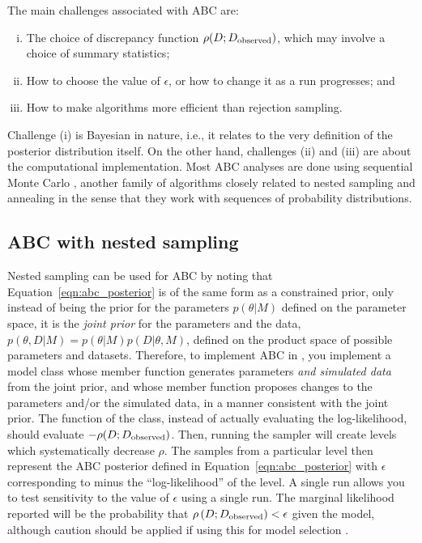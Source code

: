\documentclass[article]{jss}
\begin{document}
The main challenges associated with ABC are:
\begin{enumerate}[(i)]
\item The choice of discrepancy function $\rho(D; D_{\rm observed})$, which
may involve a choice of summary statistics;
\item How to choose the value of $\epsilon$, or how to change it as a run
progresses; and
\item How to make algorithms more efficient than rejection sampling.
\end{enumerate}
Challenge (i) is Bayesian in nature, i.e., it relates to the very
definition of the posterior distribution itself.
On the other hand, challenges (ii) and (iii) are about the computational
implementation. Most ABC analyses are done using sequential Monte Carlo
\citep[SMC; ][]{del2012adaptive}, another family of algorithms closely related
to nested sampling and annealing in the sense that they work with
sequences of probability distributions.

\subsection{ABC with nested sampling}
Nested sampling can be used for ABC by noting that Equation~\ref{eqn:abc_posterior}
is of the same form as a constrained prior, only instead of being the prior
for the parameters $p(\theta | M)$ defined on the parameter space, it is
the {\em joint prior} for the parameters and the data,
$p(\theta, D |M) = p(\theta | M)p(D | \theta, M)$, defined on the product
space of possible parameters and datasets. Therefore, to implement
ABC in , you implement a model class
whose  member function generates parameters {\em and simulated
data} from the joint prior, and whose  member function
proposes changes to the parameters and/or the simulated data, in a
manner consistent with the joint prior. The  function
of the class, instead of actually evaluating the log-likelihood, should
evaluate $-\rho(D; D_{\rm observed})$. Then, running the sampler
will create levels which systematically decrease $\rho$. The samples from
a particular level then represent the ABC posterior defined in
Equation~\ref{eqn:abc_posterior} with $\epsilon$ corresponding to minus
the ``log-likelihood'' of the level.
A single  run allows you to test sensitivity
to the value of $\epsilon$ using a single run.
The marginal likelihood reported will be
the probability that $\rho\left(D; D_{\rm observed}\right) < \epsilon$
given the model, although caution should be applied if
using this for model selection \citep{robert2011lack}.
\end{document}
